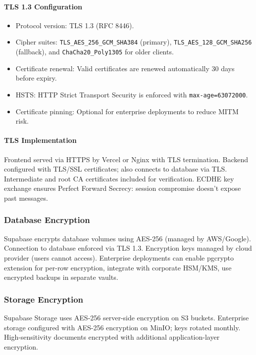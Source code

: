 \documentclass[12pt,oneside,openright,a4paper]{cpe-english-project}
\begin{document}
\paragraph{TLS 1.3 Configuration}

\begin{itemize}
\item Protocol version: TLS 1.3 (RFC 8446).
\item Cipher suites: \texttt{TLS\_AES\_256\_GCM\_SHA384} (primary), \texttt{TLS\_AES\_128\_GCM\_SHA256} (fallback), and \texttt{ChaCha20\_Poly1305} for older clients.
\item Certificate renewal: Valid certificates are renewed automatically 30 days before expiry.
\item HSTS: HTTP Strict Transport Security is enforced with \texttt{max-age=63072000}.
\item Certificate pinning: Optional for enterprise deployments to reduce MITM risk.
\end{itemize}

\paragraph{TLS Implementation}

Frontend served via HTTPS by Vercel or Nginx with TLS termination. Backend configured with TLS/SSL certificates; also connects to database via TLS. Intermediate and root CA certificates included for verification. ECDHE key exchange ensures Perfect Forward Secrecy: session compromise doesn't expose past messages.

\subsubsection{Database Encryption}

Supabase encrypts database volumes using AES-256 (managed by AWS/Google). Connection to database enforced via TLS 1.3. Encryption keys managed by cloud provider (users cannot access). Enterprise deployments can enable pgcrypto extension for per-row encryption, integrate with corporate HSM/KMS, use encrypted backups in separate vaults.

\subsubsection{Storage Encryption}

Supabase Storage uses AES-256 server-side encryption on S3 buckets. Enterprise storage configured with AES-256 encryption on MinIO; keys rotated monthly. High-sensitivity documents encrypted with additional application-layer encryption.
\end{document}

